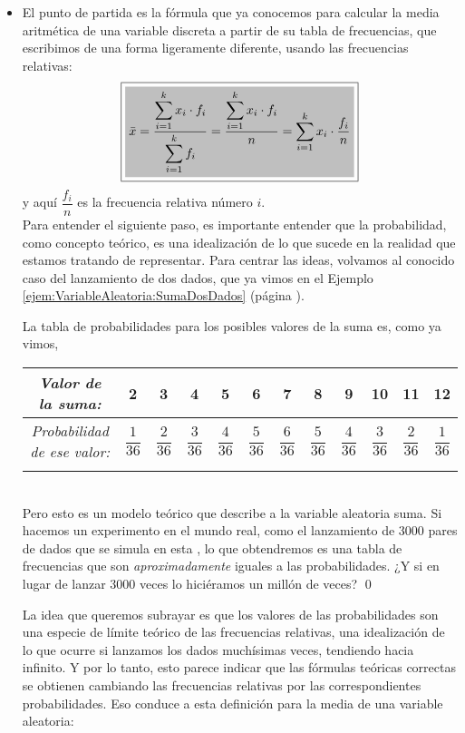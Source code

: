 \begin{itemize}
    \item El punto de partida es la fórmula que ya conocemos para calcular la media aritmética de una variable discreta a partir de su tabla de frecuencias, que escribimos de una forma ligeramente diferente, usando las frecuencias relativas:
        \[\fbox{\colorbox{Gris025}{$
        \bar x=\dfrac{\displaystyle\sum_{i=1}^k x_i\cdot f_i}{\displaystyle\sum_{i=1}^k f_i}
        =\dfrac{\displaystyle\sum_{i=1}^k x_i\cdot f_i}{n}
        =\displaystyle\sum_{i=1}^k x_i\cdot \dfrac{f_i}{n}
        $}}
        \]
        y aquí $\dfrac{f_i}{n}$ es la frecuencia relativa número $i$.\\[3mm]
        Para entender el siguiente paso, es importante entender que la probabilidad, como concepto teórico, es una idealización de lo que sucede en la realidad que estamos tratando de representar. Para centrar las ideas, volvamos al conocido caso del lanzamiento de dos dados, que ya vimos en el Ejemplo \ref{ejem:VariableAleatoria:SumaDosDados} (página \pageref{ejem:VariableAleatoria:SumaDosDados}).
        \begin{Ejemplo}\label{ejem:Cap04-VariableAleatoria:SumaDosDados}
        La tabla de probabilidades para los posibles valores de la suma es, como ya vimos,\\[3mm]
        \begin{tabular}[t]{|c|c|c|c|c|c|c|c|c|c|c|c|}
        \hline
        \rule{0cm}{0.5cm}{\em Valor de la suma:}&2&3&4&5&6&7&8&9&10&11&12\\
        \hline
        \rule{0cm}{0.7cm}{\em Probabilidad de ese valor:}&$\dfrac{1}{36}$&$\dfrac{2}{36}$&$\dfrac{3}{36}$&$\dfrac{4}{36}$&$\dfrac{5}{36}$&
        $\dfrac{6}{36}$&$\dfrac{5}{36}$&$\dfrac{4}{36}$&$\dfrac{3}{36}$&$\dfrac{2}{36}$&$\dfrac{1}{36}$\\
        &&&&&&&&&&&\\
        \hline
        \end{tabular}\\[3mm]
        Pero esto es un modelo teórico que describe a la variable aleatoria suma. Si hacemos un experimento en el mundo real, como el lanzamiento de 3000 pares de dados que se simula en esta , lo que obtendremos es una tabla de frecuencias que son {\em aproximadamente} iguales a las probabilidades. ¿Y si en lugar de lanzar 3000 veces lo hiciéramos un millón de veces?
        \qed
        \end{Ejemplo}
        La idea que queremos subrayar es que los valores de las probabilidades son una especie de límite teórico de las frecuencias relativas, una idealización de lo que ocurre si lanzamos los dados muchísimas veces, tendiendo hacia infinito. Y por lo tanto, esto parece indicar que las fórmulas teóricas correctas se obtienen cambiando las frecuencias relativas por las correspondientes probabilidades. Eso conduce a esta definición para la media de una variable aleatoria:\\[3mm]

\end{itemize}
